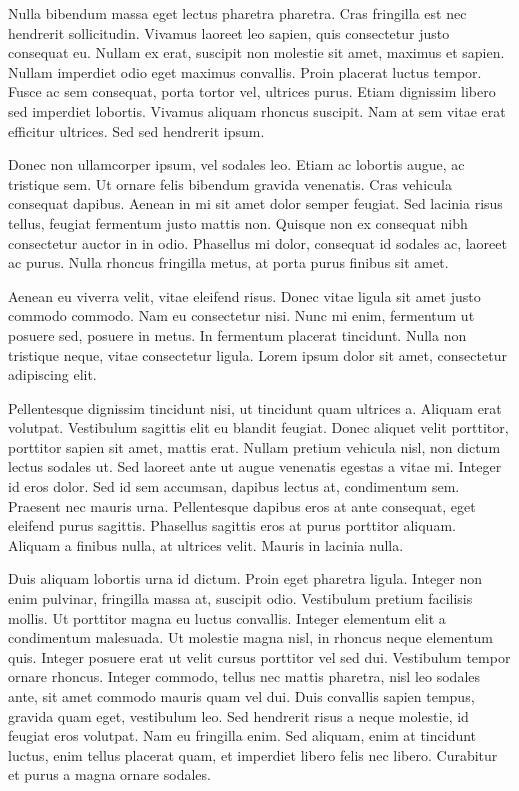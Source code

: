 \documentclass[]{article}
\begin{document}
Nulla bibendum massa eget lectus pharetra pharetra. Cras fringilla est
nec hendrerit sollicitudin. Vivamus laoreet leo sapien, quis consectetur
justo consequat eu. Nullam ex erat, suscipit non molestie sit amet,
maximus et sapien. Nullam imperdiet odio eget maximus convallis. Proin
placerat luctus tempor. Fusce ac sem consequat, porta tortor vel,
ultrices purus. Etiam dignissim libero sed imperdiet lobortis. Vivamus
aliquam rhoncus suscipit. Nam at sem vitae erat efficitur ultrices. Sed
sed hendrerit ipsum.

Donec non ullamcorper ipsum, vel sodales leo. Etiam ac lobortis augue,
ac tristique sem. Ut ornare felis bibendum gravida venenatis. Cras
vehicula consequat dapibus. Aenean in mi sit amet dolor semper feugiat.
Sed lacinia risus tellus, feugiat fermentum justo mattis non. Quisque
non ex consequat nibh consectetur auctor in in odio. Phasellus mi dolor,
consequat id sodales ac, laoreet ac purus. Nulla rhoncus fringilla
metus, at porta purus finibus sit amet.

Aenean eu viverra velit, vitae eleifend risus. Donec vitae ligula sit
amet justo commodo commodo. Nam eu consectetur nisi. Nunc mi enim,
fermentum ut posuere sed, posuere in metus. In fermentum placerat
tincidunt. Nulla non tristique neque, vitae consectetur ligula. Lorem
ipsum dolor sit amet, consectetur adipiscing elit.

Pellentesque dignissim tincidunt nisi, ut tincidunt quam ultrices a.
Aliquam erat volutpat. Vestibulum sagittis elit eu blandit feugiat.
Donec aliquet velit porttitor, porttitor sapien sit amet, mattis erat.
Nullam pretium vehicula nisl, non dictum lectus sodales ut. Sed laoreet
ante ut augue venenatis egestas a vitae mi. Integer id eros dolor. Sed
id sem accumsan, dapibus lectus at, condimentum sem. Praesent nec mauris
urna. Pellentesque dapibus eros at ante consequat, eget eleifend purus
sagittis. Phasellus sagittis eros at purus porttitor aliquam. Aliquam a
finibus nulla, at ultrices velit. Mauris in lacinia nulla.

Duis aliquam lobortis urna id dictum. Proin eget pharetra ligula.
Integer non enim pulvinar, fringilla massa at, suscipit odio. Vestibulum
pretium facilisis mollis. Ut porttitor magna eu luctus convallis.
Integer elementum elit a condimentum malesuada. Ut molestie magna nisl,
in rhoncus neque elementum quis. Integer posuere erat ut velit cursus
porttitor vel sed dui. Vestibulum tempor ornare rhoncus. Integer
commodo, tellus nec mattis pharetra, nisl leo sodales ante, sit amet
commodo mauris quam vel dui. Duis convallis sapien tempus, gravida quam
eget, vestibulum leo. Sed hendrerit risus a neque molestie, id feugiat
eros volutpat. Nam eu fringilla enim. Sed aliquam, enim at tincidunt
luctus, enim tellus placerat quam, et imperdiet libero felis nec libero.
Curabitur et purus a magna ornare sodales.
\end{document}
